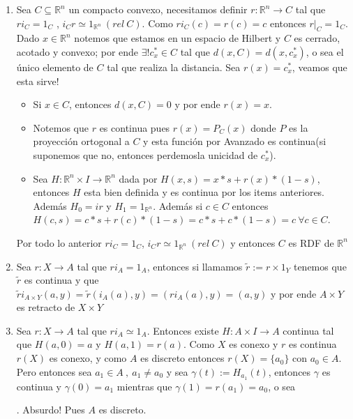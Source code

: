 \documentclass[11pt]{article}
\newcommand{\R}{{\mathbb{R}}}
\newenvironment{proof}[1][Demostraci\'on]{\begin{trivlist}
\item[\hskip \labelsep {\bfseries #1}]}{\end{trivlist}}
\newcommand{\qed}{\nobreak \ifvmode \relax \else
      \ifdim\lastskip<1.5em \hskip-\lastskip
      \hskip1.5em plus0em minus0.5em \fi \nobreak
      \vrule height0.75em width0.5em depth0.25em\fi}
\begin{document}
\begin{enumerate}
\begin{proof}

\begin{enumerate}

\item Sea $C \subseteq \R^n$ un compacto convexo, necesitamos definir $r:\R^n \rightarrow C$ tal que $ri_C=1_C$ , $i_Cr \simeq 1_{\R^n} \ (rel \ C)$. Como $ri_C(c)=r(c)=c$ entonces $r|_{C}=1_C$. Dado $x \in \R^n$ notemos que estamos en un espacio de Hilbert y $C$ es cerrado, acotado y convexo; por ende $\exists ! c_{x}^{*} \in C$ tal que $d(x,C)=d(x,c_{x}^{*})$, o sea el \'unico elemento de $C$ tal que realiza la distancia. Sea $r(x)=c_{x}^{*}$, veamos que esta sirve!

\begin{itemize}
\item Si $x \in C$, entonces $d(x,C)=0$ y por ende $r(x)=x$.
\item Notemos que $r$ es continua pues $r(x)=P_C(x)$ donde $P$ es la proyecci\'on ortogonal a $C$ y esta funci\'on por Avanzado es continua(si suponemos que no, entonces perdemosla unicidad de $c_{x}^{*}$).
\item Sea $H:\R^n \times I \rightarrow \R^n$ dada por $H(x,s)=x*s + r(x)*(1-s)$, entonces $H$ esta bien definida y es continua por los items anteriores. Adem\'as $H_0 = ir$ y $H_1 = 1_{\R^n}$. Adem\'as si $c \in C$ entonces $H(c,s)=c*s + r(c)*(1-s) = c*s + c*(1-s) = c \ \forall c \in C$.
\end{itemize}

Por todo lo anterior $ri_C = 1_C$, $i_Cr \simeq 1_{\R^n} \ (rel \ C)$ y entonces $C$ es RDF de $\R^n$


\item Sea $r:X \rightarrow A$ tal que $ri_A = 1_A$, entonces si llamamos $\tilde{r} := r \times 1_Y$ tenemos que $\tilde{r}$ es continua y que $\tilde{r}i_{A \times Y}(a,y)=\tilde{r}(i_A(a),y) = (ri_A(a),y)=(a,y)$ y por ende $A \times Y$ es retracto de $X \times Y$

\item Sea $r:X \rightarrow A$ tal que $ri_A \simeq 1_A$. Entonces existe $H:A \times I \rightarrow A$ continua tal que $H(a,0) = a$ y $H(a,1) = r(a)$. Como $X$ es conexo y $r$ es continua $r(X)$ es conexo, y como $A$ es discreto entonces $r(X)=\{a_0\}$ con $a_0 \in A$. Pero entonces sea $a_1 \in A \ , \ a_1 \neq a_0$ y sea $\gamma(t):=H_{a_1}(t)$, entonces $
\gamma$ es continua y $\gamma(0)=a_1$ mientras que $\gamma(1)=r(a_1)=a_0$, o sea . Absurdo! Pues $A$ es discreto. \qed


\end{enumerate}
\end{proof}
\end{enumerate}
\end{document}
